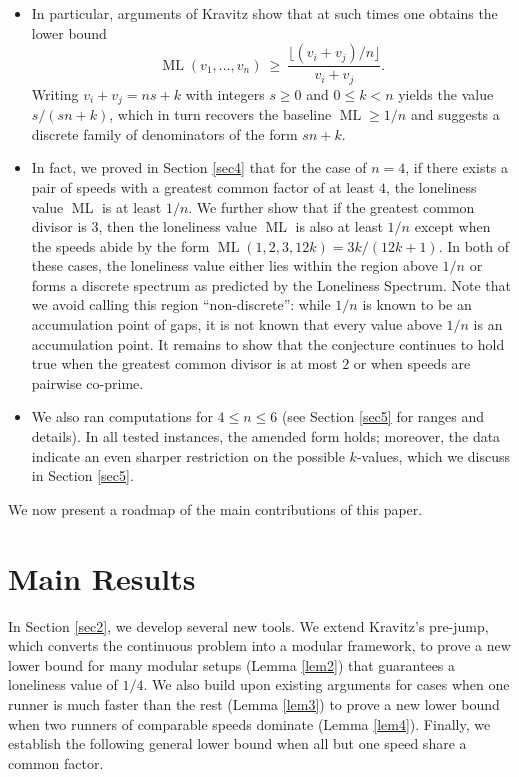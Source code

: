 \documentclass[11pt]{amsart}
\DeclareMathOperator{\ML}{ML}
\begin{document}
\begin{itemize}
  \item In particular, arguments of Kravitz show that at such times one obtains the lower bound
  \[
     \ML(v_1,\ldots,v_n)\ \ge\ \frac{\lfloor (v_i+v_j)/n\rfloor}{\,v_i+v_j\,}.
  \]
  Writing \(v_i+v_j = ns+k\) with integers \(s\ge 0\) and \(0\le k<n\) yields the value $s/(sn+k)$, which in turn recovers the baseline $\ML \geq 1/n$ and suggests a discrete family of denominators of the form \(sn+k\).
  \item In fact, we proved in Section \ref{sec4} that for the case of $n=4$, if there exists a pair of speeds with a greatest common factor of at least $4$, the loneliness value $\ML$ is at least $1/n$. We further show that if the greatest common divisor is $3$, then the loneliness value $\ML$ is also at least $1/n$ except when the speeds abide by the form $\ML(1,2,3,12k) = 3k/(12k+1)$. In both of these cases, the loneliness value either lies within the region above $1/n$ or forms a discrete spectrum as predicted by the Loneliness Spectrum. Note that we avoid calling this region ``non-discrete'': while $1/n$ is known to be an accumulation point of gaps, it is not known that every value above $1/n$ is an accumulation point.
 It remains to show that the conjecture continues to hold true when the greatest common divisor is at most $2$ or when speeds are pairwise co-prime.
  \item We also ran computations for \(4\le n\le 6\) (see Section \ref{sec5} for ranges and details). 
  In all tested instances, the amended form holds; moreover, the data indicate an even sharper restriction on the possible \(k\)-values, which we discuss in Section \ref{sec5}.
\end{itemize}

We now present a roadmap of the main contributions of this paper.

\section{Main Results}
In Section \ref{sec2}, we develop several new tools. We extend Kravitz's pre-jump, which converts the continuous problem into a modular framework, to prove a new lower bound for many modular setups (Lemma \ref{lem2}) that guarantees a loneliness value of $1/4$. We also build upon existing arguments for cases when one runner is much faster than the rest (Lemma \ref{lem3}) to prove a new lower bound when two runners of comparable speeds dominate (Lemma \ref{lem4}). Finally, we establish the following general lower bound when all but one speed share a common factor.
\end{document}
